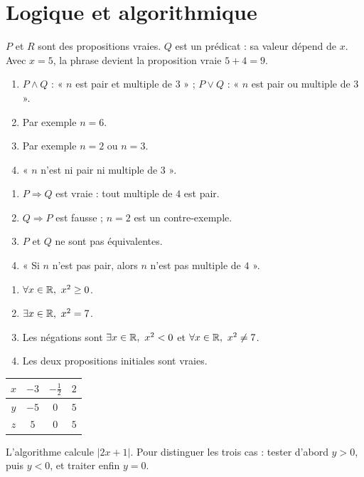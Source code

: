 \section*{Logique et algorithmique}

$P$ et $R$ sont des propositions vraies. $Q$ est un prédicat : sa valeur
dépend de $x$. Avec $x=5$, la phrase devient la proposition vraie $5+4=9$.

\begin{enumerate}
  \item $P\land Q$ : « $n$ est pair et multiple de $3$ » ;
  $P\lor Q$ : « $n$ est pair ou multiple de $3$ ».
  \item Par exemple $n=6$.
  \item Par exemple $n=2$ ou $n=3$.
  \item « $n$ n'est ni pair ni multiple de $3$ ».
\end{enumerate}

\begin{enumerate}
  \item $P\Rightarrow Q$ est vraie : tout multiple de $4$ est pair.
  \item $Q\Rightarrow P$ est fausse ; $n=2$ est un contre-exemple.
  \item $P$ et $Q$ ne sont pas équivalentes.
  \item « Si $n$ n'est pas pair, alors $n$ n'est pas multiple de $4$ ».
\end{enumerate}

\begin{enumerate}
  \item $\forall x\in\R,\ x^2\geq0$.
  \item $\exists x\in\R,\ x^2=7$.
  \item Les négations sont $\exists x\in\R,\ x^2<0$ et
  $\forall x\in\R,\ x^2\neq7$.
  \item Les deux propositions initiales sont vraies.
\end{enumerate}

\begin{center}
\begin{tabular}{c|ccc}
$x$ & $-3$ & $-\frac12$ & $2$\\ \hline
$y$ & $-5$ & $0$ & $5$\\
$z$ & $5$ & $0$ & $5$
\end{tabular}
\end{center}
L'algorithme calcule $|2x+1|$. Pour distinguer les trois cas : tester
d'abord $y>0$, puis $y<0$, et traiter enfin $y=0$.

